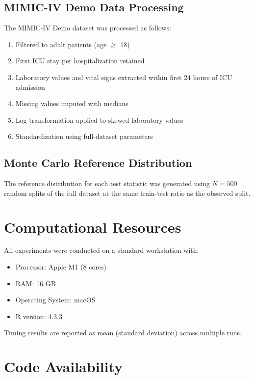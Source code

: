 \documentclass[10pt,a4paper]{article}
\begin{document}
\subsection{MIMIC-IV Demo Data Processing}

The MIMIC-IV Demo dataset was processed as follows:

\begin{enumerate}
    \item Filtered to adult patients (age $\geq$ 18)
    \item First ICU stay per hospitalization retained
    \item Laboratory values and vital signs extracted within first 24 hours of ICU admission
    \item Missing values imputed with medians
    \item Log transformation applied to skewed laboratory values
    \item Standardization using full-dataset parameters
\end{enumerate}

\subsection{Monte Carlo Reference Distribution}

The reference distribution for each test statistic was generated using $N = 500$ random splits of the full dataset at the same train-test ratio as the observed split.

\section{Computational Resources}

All experiments were conducted on a standard workstation with:

\begin{itemize}
    \item Processor: Apple M1 (8 cores)
    \item RAM: 16 GB
    \item Operating System: macOS
    \item R version: 4.3.3
\end{itemize}

Timing results are reported as mean (standard deviation) across multiple runs.

\section{Code Availability}
\end{document}

